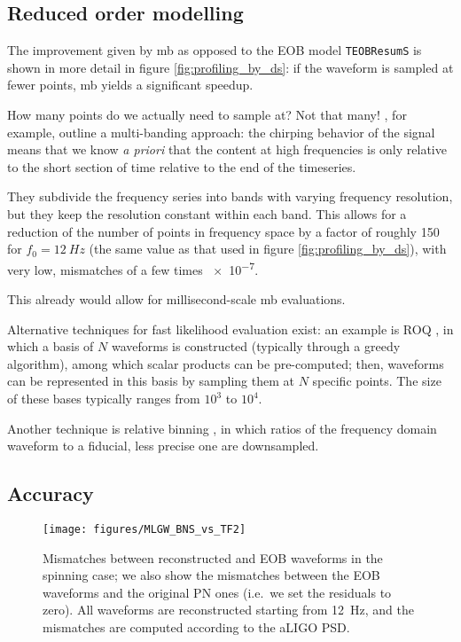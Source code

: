 \documentclass[main.tex]{subfiles}
\begin{document}
\subsection{Reduced order modelling} \label{sec:reduced-order-modelling}

The improvement given by \ac{mb} as opposed to the \ac{EOB} model \texttt{TEOBResumS} is shown in more detail in figure \ref{fig:profiling_by_ds}: if the waveform is sampled at fewer points, \ac{mb} yields a significant speedup. 

How many points do we actually need to sample at? Not that many! 
\textcite{vinciguerraAcceleratingGravitationalWave2017}, for example, outline a multi-banding approach: the chirping behavior of the signal means that we know \emph{a priori} that the content at high frequencies is only relative to the short section of time relative to the end of the timeseries. 

They subdivide the frequency series into bands with varying frequency resolution, but they keep the resolution constant within each band.
This allows for a reduction of the number of points in frequency space by a factor of roughly 150 for \(f_0 = \SI{12}{Hz}\) (the same value as that used in figure \ref{fig:profiling_by_ds}), with very low, mismatches of a few times \num{e-7}. 

This already would allow for millisecond-scale \ac{mb} evaluations. 

Alternative techniques for fast likelihood evaluation exist: an example is \ac{ROQ} \cites{smithFastAccurateInference2016}{canizaresAcceleratedGravitationalWave2015}, in which a basis of \(N\) waveforms is constructed (typically through a greedy algorithm), among which scalar products can be pre-computed; then, waveforms can be represented in this basis by sampling them at \(N\) specific points. 
The size of these bases typically ranges from \(10^3\) to \(10^4\). 

Another technique is relative binning \cite{zackayRelativeBinningFast2018}, in which ratios of the frequency domain waveform to a fiducial, less precise one are downsampled. 


\subsection{Accuracy} \label{sec:accuracy}

\begin{figure}[ht]
\centering
\texttt{[image: figures/MLGW\_BNS\_vs\_TF2]}
\caption{Mismatches between reconstructed and \ac{EOB} waveforms in the spinning case; we also show the mismatches between the \ac{EOB} waveforms and the original \ac{PN} ones (i.e.\ we set the residuals to zero). All waveforms are reconstructed starting from \SI{12}{Hz}, and the mismatches are computed according to the \ac{aLIGO} \ac{PSD}.}
\label{fig:MLGW_BNS_vs_TF2}
\end{figure}
\end{document}
